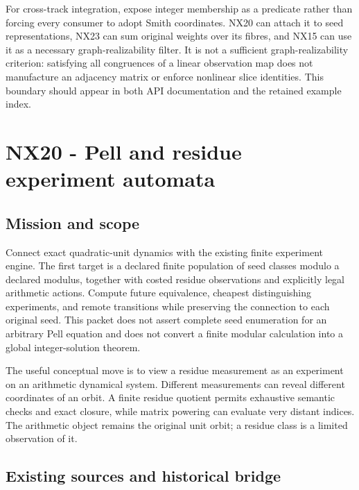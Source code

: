 \documentclass[
  11pt,
  a4paper,
]{report}
\begin{document}
For cross-track integration, expose integer membership as a predicate
rather than forcing every consumer to adopt Smith coordinates. NX20 can
attach it to seed representations, NX23 can sum original weights over
its fibres, and NX15 can use it as a necessary graph-realizability
filter. It is not a sufficient graph-realizability criterion: satisfying
all congruences of a linear observation map does not manufacture an
adjacency matrix or enforce nonlinear slice identities. This boundary
should appear in both API documentation and the retained example index.

\hypertarget{nx20---pell-and-residue-experiment-automata}{%
\chapter{NX20 - Pell and residue experiment
automata}\label{nx20---pell-and-residue-experiment-automata}}

\hypertarget{mission-and-scope}{%
\section{Mission and scope}\label{mission-and-scope}}

Connect exact quadratic-unit dynamics with the existing finite
experiment engine. The first target is a declared finite population of
seed classes modulo a declared modulus, together with costed residue
observations and explicitly legal arithmetic actions. Compute future
equivalence, cheapest distinguishing experiments, and remote transitions
while preserving the connection to each original seed. This packet does
not assert complete seed enumeration for an arbitrary Pell equation and
does not convert a finite modular calculation into a global
integer-solution theorem.

The useful conceptual move is to view a residue measurement as an
experiment on an arithmetic dynamical system. Different measurements can
reveal different coordinates of an orbit. A finite residue quotient
permits exhaustive semantic checks and exact closure, while matrix
powering can evaluate very distant indices. The arithmetic object
remains the original unit orbit; a residue class is a limited
observation of it.

\hypertarget{existing-sources-and-historical-bridge}{%
\section{Existing sources and historical
bridge}\label{existing-sources-and-historical-bridge}}
\end{document}
